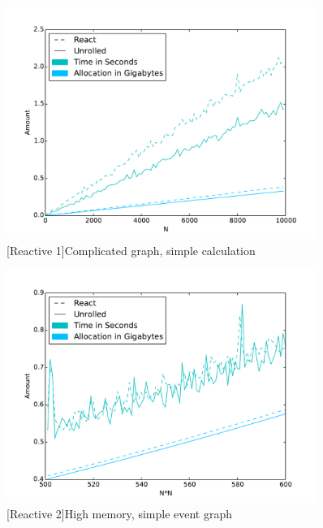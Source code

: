 \begin{figure}
\centering
    \begin{minipage}{.5\textwidth}
        \centering
        \includegraphics[width=0.9\textwidth]{graphics/react_bench_2.pdf}
        [Reactive 1]{Complicated graph, simple calculation}
        \label{fig:reactive1}
    \end{minipage}%
    \begin{minipage}{.5\textwidth}
        \centering
        \includegraphics[width=0.9\textwidth]{graphics/react_bench_1.pdf}
        [Reactive 2]{High memory, simple event graph}
        \label{fig:reactive2}
    \end{minipage}
\end{figure}

